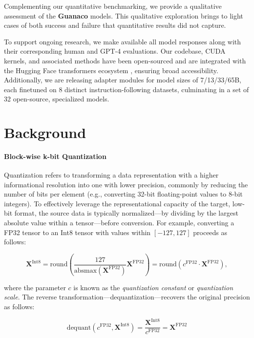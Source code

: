 Complementing our quantitative benchmarking, we provide a qualitative assessment of the \textbf{Guanaco} models. This qualitative exploration brings to light cases of both success and failure that quantitative results did not capture.

To support ongoing research, we make available all model responses along with their corresponding human and GPT-4 evaluations. Our codebase, CUDA kernels, and associated methods have been open-sourced and are integrated with the Hugging Face transformers ecosystem \citep{wolf2019huggingface}, ensuring broad accessibility. Additionally, we are releasing adapter modules for model sizes of 7/13/33/65B, each finetuned on 8 distinct instruction-following datasets, culminating in a set of 32 open-source, specialized models.

\section{Background}
\paragraph{Block-wise k-bit Quantization} Quantization refers to transforming a data representation with a higher informational resolution into one with lower precision, commonly by reducing the number of bits per element (e.g., converting 32-bit floating-point values to 8-bit integers). To effectively leverage the representational capacity of the target, low-bit format, the source data is typically normalized—by dividing by the largest absolute value within a tensor—before conversion. For example, converting a FP32 tensor to an Int8 tensor with values within $[-127, 127]$ proceeds as follows:

\begin{equation}
    \mathbf{X}^{ \text{Int8}} = \text{round}\left( \frac{127}{{\text{absmax}}(\mathbf{X}^{{\text{FP32}}})}\mathbf{X}^{{\text{FP32}}} \right) = \text{round}(c^{\text{FP32}}\cdot \mathbf{X}^{{\text{FP32}}}),
\end{equation}

where the parameter $c$ is known as the {\em quantization constant} or {\em quantization scale}. The reverse transformation—dequantization—recovers the original precision as follows:

\begin{equation}
    \text{dequant}(c^{\text{FP32}}, \mathbf{X}^{\text{Int8}}) = \frac{\mathbf{X}^{\text{Int8}}}{c^{\text{FP32}}} = \mathbf{X}^{\text{FP32}}
\end{equation}

